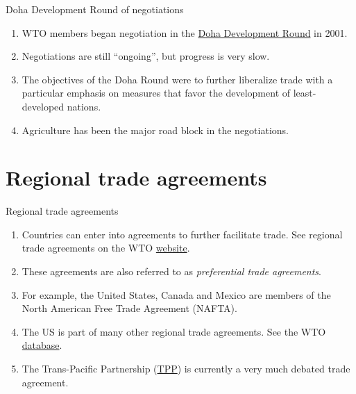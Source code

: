 \documentclass[table,xcolor=pdftex,dvipsnames]{beamer}\usepackage[]{graphicx}\usepackage[]{color}
\begin{document}

\begin{frame}{Doha Development Round of negotiations}
\begin{enumerate}[label=\textbullet]
    \item WTO members began negotiation in the \href{http://www.wto.org/english/tratop_e/dda_e/dda_e.htm}{Doha Development Round} in 2001.
    \item Negotiations are still ``ongoing'', but progress is very slow.
    \item The objectives of the Doha Round were to further liberalize trade with a particular emphasis on measures that favor the development of least-developed nations.
    \item Agriculture has been the major road block in the negotiations.
\end{enumerate}
\end{frame}

\section{Regional trade agreements}

\begin{frame}{Regional trade agreements}
\begin{enumerate}[label=\textbullet]
    \item Countries can enter into agreements to further facilitate trade. See regional trade agreements on the WTO \href{http://www.wto.org/english/tratop_e/region_e/region_e.htm}{website}.
    \item These agreements are also referred to as \emph{preferential trade agreements}.
    \item For example, the United States, Canada and Mexico are members of the North American Free Trade Agreement (NAFTA).
    \item The US is part of many other regional trade agreements. See the WTO \href{http://www.wto.org/english/tratop_e/region_e/rta_participation_map_e.htm}{database}.
    \item The Trans-Pacific Partnership (\href{https://ustr.gov/tpp/}{TPP}) is currently a very much debated trade agreement.
\end{enumerate}
\end{frame}

\end{document}
